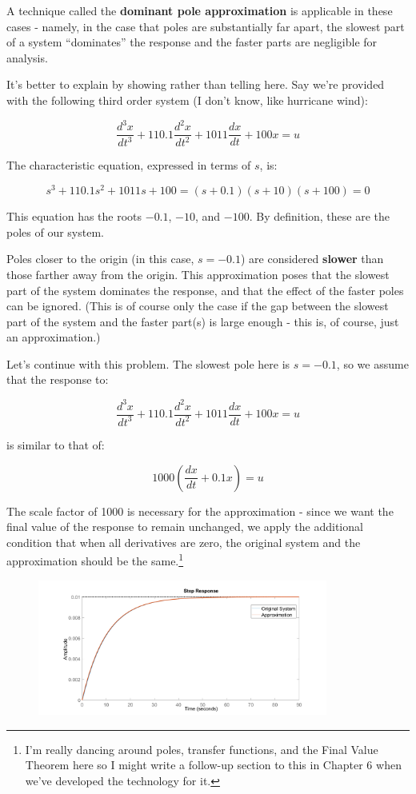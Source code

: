 \documentclass[
  letterpaper,
  DIV=11,
  numbers=noendperiod]{scrreprt}
\begin{document}
A technique called the \textbf{dominant pole approximation} is
applicable in these cases - namely, in the case that poles are
substantially far apart, the slowest part of a system ``dominates'' the
response and the faster parts are negligible for analysis.

It's better to explain by showing rather than telling here. Say we're
provided with the following third order system (I don't know, like
hurricane wind):

\[ \frac{d^3 x}{dt^3} + 110.1 \frac{d^2 x}{dt^2} + 1011 \frac{d x}{dt} + 100x = u \]

The characteristic equation, expressed in terms of \(s\), is:

\[ s^3 + 110.1 s^2 + 1011 s + 100 = (s+0.1)(s+10)(s+100) = 0 \]

This equation has the roots \(-0.1\), \(-10\), and \(-100\). By
definition, these are the poles of our system.

Poles closer to the origin (in this case, \(s=-0.1\)) are considered
\textbf{slower} than those farther away from the origin. This
approximation poses that the slowest part of the system dominates the
response, and that the effect of the faster poles can be ignored. (This
is of course only the case if the gap between the slowest part of the
system and the faster part(s) is large enough - this is, of course, just
an approximation.)

Let's continue with this problem. The slowest pole here is \(s=-0.1\),
so we assume that the response to:

\[ \frac{d^3 x}{dt^3} + 110.1 \frac{d^2 x}{dt^2} + 1011 \frac{d x}{dt} + 100x = u \]

is similar to that of:

\[ 1000 \left( \frac{d x}{dt} + 0.1 x \right) = u \]

The scale factor of 1000 is necessary for the approximation - since we
want the final value of the response to remain unchanged, we apply the
additional condition that when all derivatives are zero, the original
system and the approximation should be the same.\footnote{I'm really
  dancing around poles, transfer functions, and the Final Value Theorem
  here so I might write a follow-up section to this in Chapter 6 when
  we've developed the technology for it.}

\begin{figure}

{\centering \includegraphics[width=0.85\textwidth,height=\textheight]{figs/3_approx.png}

}

\end{figure}
\end{document}
